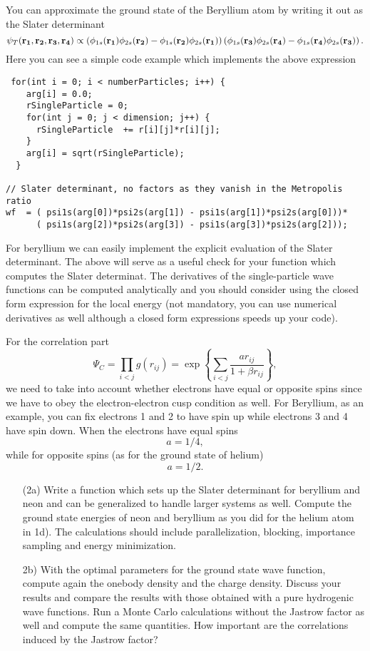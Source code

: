 You can approximate the ground state of the Beryllium atom by writing it out as the Slater determinant 
\begin{equation}
   \psi_{T}({\bf r_1},{\bf r_2}, {\bf r_3}, {\bf r_4}) \propto 
\left(\phi_{1s}({\bf r_1})\phi_{2s}({\bf r_2})-\phi_{1s}({\bf r_2})\phi_{2s}({\bf r_1})\right)
\left(\phi_{1s}({\bf r_3})\phi_{2s}({\bf r_4})-\phi_{1s}({\bf r_4})\phi_{2s}({\bf r_3})\right).
\end{equation}
Here you can see a simple code example which implements the above expression
\vspace{12pt}
\begin{lstlisting}
 for(int i = 0; i < numberParticles; i++) {
    arg[i] = 0.0;
    rSingleParticle = 0;
    for(int j = 0; j < dimension; j++) {
      rSingleParticle  += r[i][j]*r[i][j];
    }
    arg[i] = sqrt(rSingleParticle);
  }
  
// Slater determinant, no factors as they vanish in the Metropolis ratio
wf  = ( psi1s(arg[0])*psi2s(arg[1]) - psi1s(arg[1])*psi2s(arg[0]))*
      ( psi1s(arg[2])*psi2s(arg[3]) - psi1s(arg[3])*psi2s(arg[2]));
\end{lstlisting}
\vspace{12pt}
For beryllium we can easily implement the explicit evaluation of the Slater determinant.  The above will serve as a useful check
for your function which computes the Slater determinat. The derivatives of the single-particle wave functions can be computed analytically and you should consider
using the closed form expression for the local energy (not mandatory, you can use numerical derivatives as well although a closed form expressions speeds up your code).

For the correlation part 
\[
\Psi_C=\prod_{i< j}g(r_{ij})= \exp{\left\{\sum_{i<j}\frac{ar_{ij}}{1+\beta r_{ij}}\right\}},
\]
we need to take into account whether electrons have equal or opposite spins since we have to obey the
electron-electron cusp condition as well.  For Beryllium, as an example,  you can fix electrons 1 and 2 to have spin up while
electrons 3 and 4 have spin down.
When the electrons have  equal spins 
\[
a= 1/4,
\]
while for opposite spins (as for the ground state of  helium)
\[
a= 1/2.
\] 

\begin{enumerate}
\item[(2a)]   Write a function which sets up the Slater determinant for beryllium and neon and can be generalized to
handle larger systems as well. 
Compute the ground state energies of neon and beryllium as you did for the helium atom
in 1d). 
The calculations should include  parallelization, blocking, importance sampling and energy minimization.  


\item[2b)]  With the optimal parameters for the ground state wave function, compute again the onebody density and 
the charge density. Discuss your results and compare the results with those obtained with a pure hydrogenic wave functions. Run a Monte Carlo calculations without the Jastrow factor as well
and compute the same quantities. How important are the correlations induced by the Jastrow factor?


\end{enumerate}